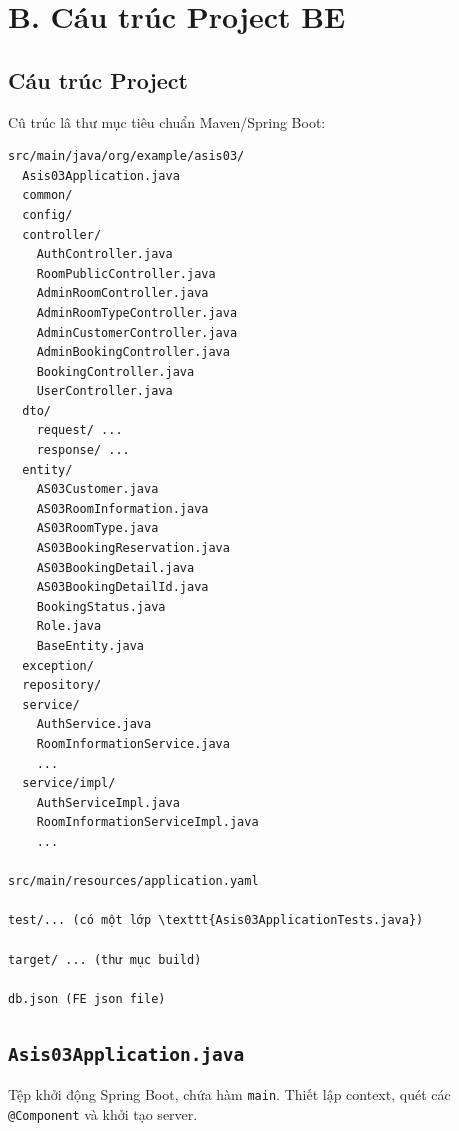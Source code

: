 \documentclass[12pt,a4paper]{article}
\begin{document}
\newpage
\section*{B. C\'au tr\'uc Project BE}
\subsection{C\'au tr\'uc Project}
C\^u tr\'uc l\^a thư mục tiêu chuẩn Maven/Spring Boot:
\begin{verbatim}
src/main/java/org/example/asis03/
  Asis03Application.java
  common/
  config/
  controller/
    AuthController.java
    RoomPublicController.java
    AdminRoomController.java
    AdminRoomTypeController.java
    AdminCustomerController.java
    AdminBookingController.java
    BookingController.java
    UserController.java
  dto/
    request/ ...
    response/ ...
  entity/
    AS03Customer.java
    AS03RoomInformation.java
    AS03RoomType.java
    AS03BookingReservation.java
    AS03BookingDetail.java
    AS03BookingDetailId.java
    BookingStatus.java
    Role.java
    BaseEntity.java
  exception/
  repository/
  service/
    AuthService.java
    RoomInformationService.java
    ...
  service/impl/
    AuthServiceImpl.java
    RoomInformationServiceImpl.java
    ...

src/main/resources/application.yaml

test/... (có một lớp \texttt{Asis03ApplicationTests.java})

target/ ... (thư mục build)

db.json (FE json file)
\end{verbatim}

\subsection{\texttt{Asis03Application.java}}
Tệp khởi động Spring Boot, chứa hàm \texttt{main}. Thiết lập context,
quét các \texttt{@Component} và khởi tạo server.
\end{document}
